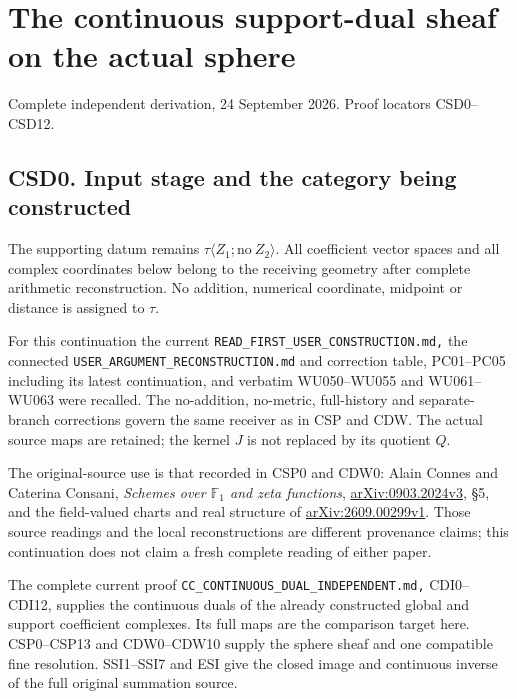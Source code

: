 \section{The continuous support-dual sheaf on the actual
sphere}\label{the-continuous-support-dual-sheaf-on-the-actual-sphere}

Complete independent derivation, 24 September 2026. Proof locators
CSD0--CSD12.

\subsection{CSD0. Input stage and the category being
constructed}\label{csd0.-input-stage-and-the-category-being-constructed}

The supporting datum remains
\(\tau\langle Z_1;\mathrm{no}\ Z_2\rangle\). All coefficient vector
spaces and all complex coordinates below belong to the receiving
geometry after complete arithmetic reconstruction. No addition,
numerical coordinate, midpoint or distance is assigned to \(\tau\).

For this continuation the current
\nolinkurl{READ_FIRST_USER_CONSTRUCTION.md,} the connected
\nolinkurl{USER_ARGUMENT_RECONSTRUCTION.md} and correction table,
PC01--PC05 including its latest continuation, and verbatim WU050--WU055
and WU061--WU063 were recalled. The no-addition, no-metric, full-history
and separate-branch corrections govern the same receiver as in CSP and
CDW. The actual source maps are retained; the kernel \(J\) is not
replaced by its quotient \(Q\).

The original-source use is that recorded in CSP0 and CDW0: Alain Connes
and Caterina Consani, \emph{Schemes over \(\mathbb F_1\) and zeta
functions}, \href{https://arxiv.org/abs/0903.2024v3}{arXiv:0903.2024v3},
§5, and the field-valued charts and real structure of
\href{https://arxiv.org/abs/2609.00299v1}{arXiv:2609.00299v1}. Those
source readings and the local reconstructions are different provenance
claims; this continuation does not claim a fresh complete reading of
either paper.

The complete current proof
\nolinkurl{CC_CONTINUOUS_DUAL_INDEPENDENT.md,} CDI0--CDI12, supplies the
continuous duals of the already constructed global and support
coefficient complexes. Its full maps are the comparison target here.
CSP0--CSP13 and CDW0--CDW10 supply the sphere sheaf and one compatible
fine resolution. SSI1--SSI7 and ESI give the closed image and continuous
inverse of the full original summation source.

